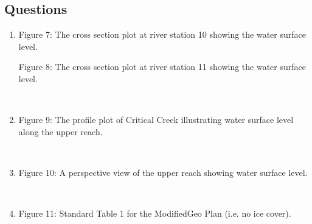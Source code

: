 \documentclass[]{article}
\newcommand\setItemnumber[1]{\setcounter{enumi}{\numexpr#1-1\relax}}
\begin{document}
\subsection{Questions} \vspace{0.25cm}
\begin{enumerate}[label=\textbf{\arabic*.}] 
	\setItemnumber{11}
	\item \begin{minipage}[t]{\linewidth}
		\raggedright
		
		\medskip
		\begin{center} 
			Figure 7: The cross section plot at river station 10 showing the water surface level.
		\end{center}
		\medskip
	\medskip
	\begin{center} 
		Figure 8: The cross section plot at river station 11 showing the water surface level.
	\end{center}
	\end{minipage} \\
	\setItemnumber{12}
	\item \begin{minipage}[t]{\linewidth}
		\raggedright
		
		\medskip
		\begin{center} 
			Figure 9: The profile plot of Critical Creek illustrating water surface level along the upper reach.
		\end{center}
	\end{minipage} 
	\setItemnumber{13} \\
	\item \begin{minipage}[t]{\linewidth}
		\raggedright
		
		\medskip
		\begin{center} 
			Figure 10: A perspective view of the upper reach showing water surface level.
		\end{center}
	\end{minipage}
\setItemnumber{14} \\
\item \begin{minipage}[t]{\linewidth}
	\raggedright
	
	\medskip
	\begin{center} 
		Figure 11: Standard Table 1 for the ModifiedGeo Plan (i.e. no ice cover).
	\end{center}
\end{minipage}
\end{enumerate}
\newpage
\end{document}
